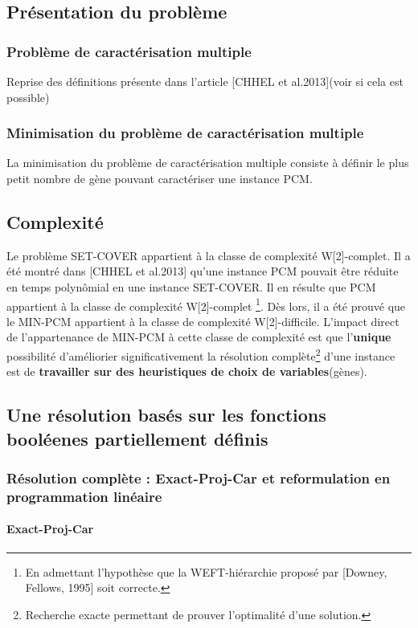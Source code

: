 \documentclass[a4paper,10pt]{article}
\begin{document}
\subsection{Présentation du problème}
\subsubsection*{Problème de caractérisation multiple}
Reprise des définitions présente dans l'article [CHHEL et al.2013](voir si cela est possible)
\subsubsection*{Minimisation du problème de caractérisation multiple}
La minimisation du problème de caractérisation multiple consiste à définir le plus petit nombre de gène pouvant caractériser une instance PCM.
\subsection{Complexité}
Le problème SET-COVER appartient à la classe de complexité W[2]-complet. Il a été montré dans [CHHEL et al.2013] qu'une instance PCM pouvait être réduite en temps polynômial en une instance SET-COVER. Il en résulte que PCM appartient à la classe de complexité W[2]-complet \footnote{En admettant l'hypothèse que la WEFT-hiérarchie proposé par [Downey, Fellows, 1995] soit correcte.}. Dès lors, il a été prouvé que le MIN-PCM appartient à la classe de complexité W[2]-difficile. L'impact direct de l'appartenance de MIN-PCM à cette classe de complexité est que l'\textbf{unique} possibilité d'améliorier significativement la résolution complète\footnote{Recherche exacte permettant de prouver l'optimalité d'une solution.} d'une instance est de \textbf{travailler sur des heuristiques de choix de variables}(gènes). 

\subsection{Une résolution basés sur les fonctions booléenes partiellement définis}
\subsubsection{Résolution complète : Exact-Proj-Car et reformulation en programmation linéaire}
\paragraph{Exact-Proj-Car}
\end{document}
